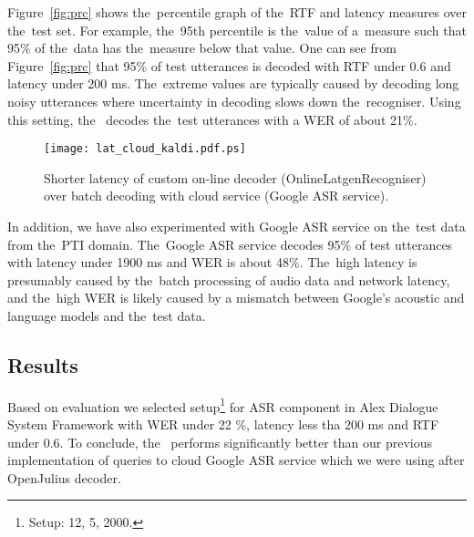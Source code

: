 Figure~\ref{fig:prc} shows the~percentile graph of the~RTF and latency measures over the~test set.
For example, the~95th percentile is the~value of a~measure such that 95\% of the~data has the~measure below that value.
One can see from Figure~\ref{fig:prc} that 95\% of test utterances is decoded with RTF under 0.6 and latency under 200 ms.
The~extreme values are typically caused by decoding long noisy utterances where uncertainty in decoding slows down the~recogniser.
Using this setting, the~ decodes the~test utterances with a WER of about 21\%.


\begin{figure*}[t]
    \begin{center}
    \texttt{[image: lat\_cloud\_kaldi.pdf.ps]}
    \caption{Shorter latency of custom on-line decoder (OnlineLatgenRecogniser) over batch decoding with cloud service (Google ASR service).}
    \label{fig:wer} 
    \end{center}
\end{figure*}

In addition, we have also experimented with Google ASR service on the~test data from the~PTI domain.
The~Google ASR service decodes 95\% of test utterances with latency under 1900 ms and WER is about 48\%.
The~high latency is presumably caused by the~batch processing of audio data and network latency, and the~high WER is likely caused by a mismatch between Google's acoustic and language models and the~test data.

\subsection*{Results}
\label{sec:results}
Based on evaluation we selected setup\footnote{Setup:  12,  5,  2000.} for ASR component in Alex Dialogue System Framework with  WER under 22 \%, latency less tha 200 ms and RTF under 0.6.
To conclude, the~ performs significantly better than our previous implementation of queries to cloud Google ASR service which we were using after OpenJulius decoder.

